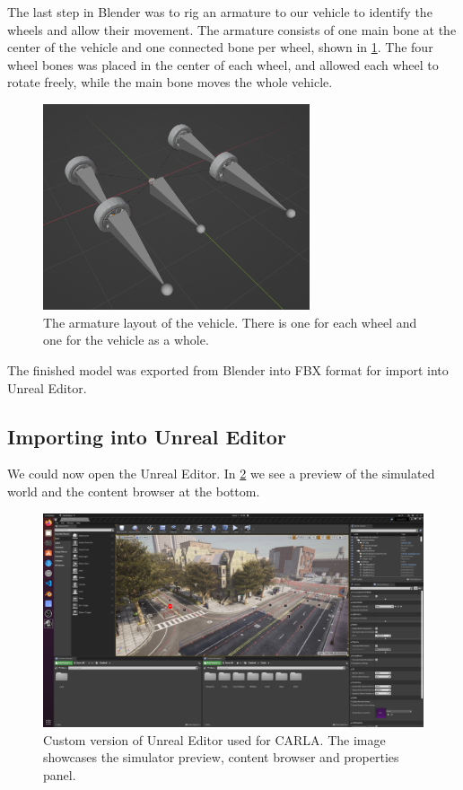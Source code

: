 The last step in Blender was to rig an armature to our vehicle to identify the wheels and allow their movement. The armature consists of one main bone at the center of the vehicle and one connected bone per wheel, shown in \cref{fig:blender-armature}. The four wheel bones was placed in the center of each wheel, and allowed each wheel to rotate freely, while the main bone moves the whole vehicle.

\begin{figure}[h!]
    \centering
    \includegraphics[width=0.7\textwidth]{chapters/3-method/figures/blender-kia-armature.png}
    \caption{The armature layout of the vehicle. There is one for each wheel and one for the vehicle as a whole.}
    \label{fig:blender-armature}
\end{figure}

The finished model was exported from Blender into FBX format for import into Unreal Editor.


\subsection{Importing into Unreal Editor}
We could now open the Unreal Editor. In \cref{fig:ue} we see a preview of the simulated world and the content browser at the bottom. 

\begin{figure}[h!]
    \centering
    \includegraphics[width=\textwidth]{chapters/3-method/figures/ue.png}
    \caption{Custom version of Unreal Editor used for CARLA. The image showcases the simulator preview, content browser and properties panel.}
    \label{fig:ue}
\end{figure}

